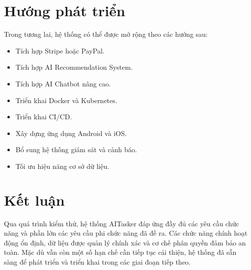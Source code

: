 
\section{Hướng phát triển}

Trong tương lai, hệ thống có thể được mở rộng theo các hướng sau:

\begin{itemize}

\item Tích hợp Stripe hoặc PayPal.

\item Tích hợp AI Recommendation System.

\item Tích hợp AI Chatbot nâng cao.

\item Triển khai Docker và Kubernetes.

\item Triển khai CI/CD.

\item Xây dựng ứng dụng Android và iOS.

\item Bổ sung hệ thống giám sát và cảnh báo.

\item Tối ưu hiệu năng cơ sở dữ liệu.

\end{itemize}


\section{Kết luận}

Qua quá trình kiểm thử, hệ thống AITasker đáp ứng đầy đủ các yêu cầu chức năng
và phần lớn các yêu cầu phi chức năng đã đề ra. Các chức năng chính hoạt động
ổn định, dữ liệu được quản lý chính xác và cơ chế phân quyền đảm bảo an toàn.
Mặc dù vẫn còn một số hạn chế cần tiếp tục cải thiện, hệ thống đã sẵn sàng để
phát triển và triển khai trong các giai đoạn tiếp theo.